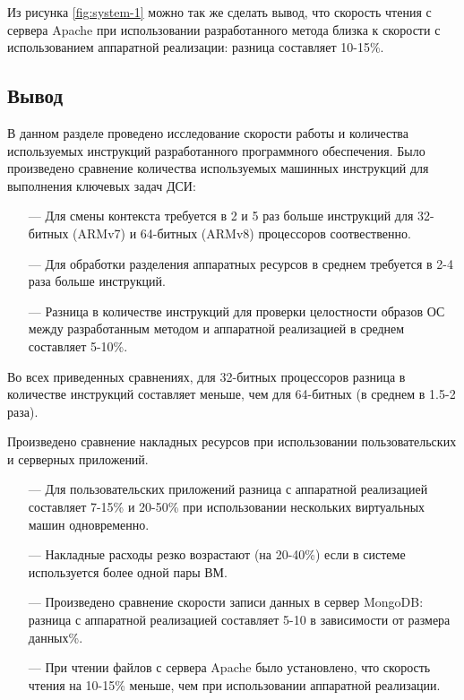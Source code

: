 Из рисунка \ref{fig:system-1} можно так же сделать вывод, что скорость чтения с сервера Apache при использовании разработанного метода близка к скорости с использованием аппаратной реализации: разница составляет 10-15\%.

\subsection*{Вывод}

В данном разделе проведено исследование скорости работы и количества используемых инструкций разработанного программного обеспечения. Было произведено сравнение количества используемых машинных инструкций для выполнения ключевых задач ДСИ: 

\begin{itemize}
	\item [---] Для смены контекста требуется в 2 и 5 раз больше инструкций для 32-битных (ARMv7) и 64-битных (ARMv8) процессоров соотвественно.
	\item [---] Для обработки разделения аппаратных ресурсов в среднем требуется в 2-4 раза больше инструкций.
	\item [---] Разница в количестве инструкций для проверки целостности образов ОС между разработанным методом и аппаратной реализацией в среднем составляет 5-10\%.
\end{itemize}

Во всех приведенных сравнениях, для 32-битных процессоров разница в количестве инструкций составляет меньше, чем для 64-битных (в среднем в 1.5-2 раза). 

Произведено сравнение накладных ресурсов при использовании пользовательских и серверных приложений.

\begin{itemize}
	\item [---] Для пользовательских приложений разница с аппаратной реализацией составляет 7-15\% и 20-50\% при использовании нескольких виртуальных машин одновременно.
	\item [---] Накладные расходы резко возрастают (на 20-40\%) если в системе используется более одной пары ВМ.
	\item [---] Произведено сравнение скорости записи данных в сервер MongoDB: разница с аппаратной реализацией составляет 5-10 в зависимости от размера данных\%.
	\item [---] При чтении файлов с сервера Apache было установлено, что скорость чтения на 10-15\% меньше, чем при использовании аппаратной реализации.
\end{itemize}

\pagebreak
